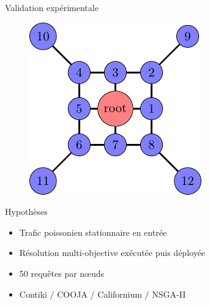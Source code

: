 \begin{frame}{Validation expérimentale}
  \begin{figure}
    \centering
    \includegraphics[scale=.7]{figures/topology_cache_slides.pdf}
  \end{figure}

  \begin{block}{Hypothèses}
    \begin{itemize}
      \item Trafic poissonien stationnaire en entrée
      \item Résolution multi-objective exécutée puis déployée
      \item 50 requêtes par nœuds
      \item Contiki / COOJA / Californium / NSGA-II
    \end{itemize}
  \end{block}

\end{frame}

